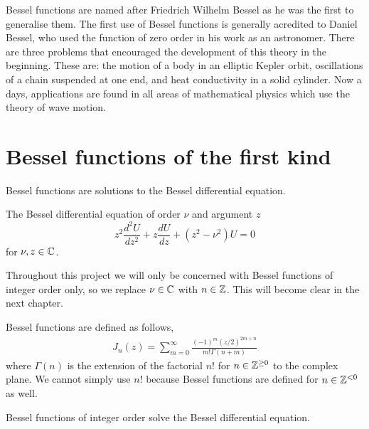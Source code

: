 
Bessel functions are named after Friedrich Wilhelm Bessel as he was the first to generalise them. The first use of Bessel functions is generally acredited to Daniel Bessel, who used the function of zero order in his work as an astronomer. There are three problems that encouraged the development of this theory in the beginning. These are: the motion of a body in an elliptic Kepler orbit, oscillations of a chain suspended at one end, and heat conductivity in a solid cylinder. Now a days, applications are found in all areas of mathematical physics which use the theory of wave motion.

\section{Bessel functions of the first kind}
Bessel functions are solutions to the Bessel differential equation.
%
%
\begin{defn}The Bessel differential equation of order $\nu$ and argument $z$
  \begin{equation}\label{eq:bessel_differential}
      z^2 \frac{d^2 U}{dz^2} + z\frac{dU}{dz} + (z^2 - \nu^2)U = 0
  \end{equation}
for $\nu, z \in \mathbb{C}$.
\end{defn}\par
%
Throughout this project we will only be concerned with Bessel functions of integer order only, so we replace $\nu \in \mathbb{C}$ with $n \in \mathbb{Z}$. This will become clear in the next chapter.
%
\begin{defn}\label{defn:bessel_func}
Bessel functions are defined as follows,
  \begin{align*}
      J_n(z) = \sum^\infty_{m=0} \frac{
      (-1)^m (z/2)^{2m+n} }{
      m! \Gamma(n+m) }
  \end{align*}
where $\Gamma(n)$ is the extension of the factorial $n!$ for $n \in \mathbb{Z}^{\geq 0}$ to the complex plane. We cannot simply use $n!$ because Bessel functions are defined for $n \in \mathbb{Z}^{< 0}$ as well.
\end{defn}
%
%
\begin{propn} Bessel functions of integer order solve the Bessel differential equation.
\end{propn}
